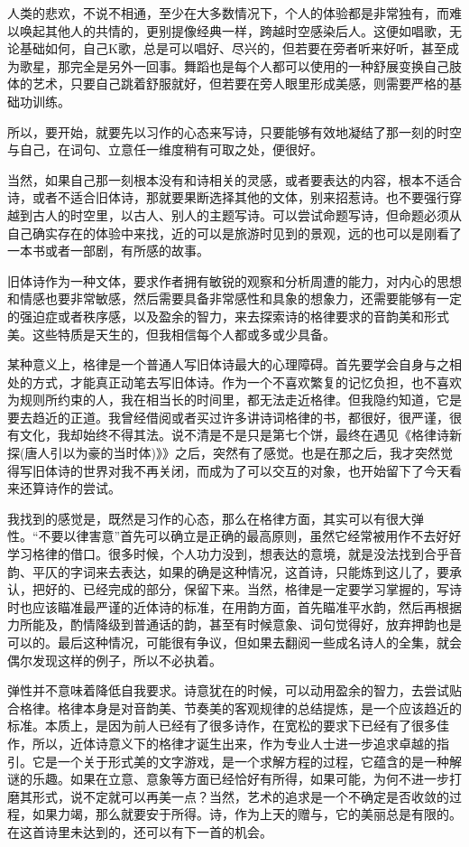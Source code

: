 \documentclass{article}
\begin{document}
人类的悲欢，不说不相通，至少在大多数情况下，个人的体验都是非常独有，而难以唤起其他人的共情的，更别提像经典一样，跨越时空感染后人。这便如唱歌，无论基础如何，自己K歌，总是可以唱好、尽兴的，但若要在旁者听来好听，甚至成为歌星，那完全是另外一回事。舞蹈也是每个人都可以使用的一种舒展变换自己肢体的艺术，只要自己跳着舒服就好，但若要在旁人眼里形成美感，则需要严格的基础功训练。

所以，要开始，就要先以习作的心态来写诗，只要能够有效地凝结了那一刻的时空与自己，在词句、立意任一维度稍有可取之处，便很好。

当然，如果自己那一刻根本没有和诗相关的灵感，或者要表达的内容，根本不适合诗，或者不适合旧体诗，那就要果断选择其他的文体，别来招惹诗。也不要强行穿越到古人的时空里，以古人、别人的主题写诗。可以尝试命题写诗，但命题必须从自己确实存在的体验中来找，近的可以是旅游时见到的景观，远的也可以是刚看了一本书或者一部剧，有所感的故事。

旧体诗作为一种文体，要求作者拥有敏锐的观察和分析周遭的能力，对内心的思想和情感也要非常敏感，然后需要具备非常感性和具象的想象力，还需要能够有一定的强迫症或者秩序感，以及盈余的智力，来去探索诗的格律要求的音韵美和形式美。这些特质是天生的，但我相信每个人都或多或少具备。

某种意义上，格律是一个普通人写旧体诗最大的心理障碍。首先要学会自身与之相处的方式，才能真正动笔去写旧体诗。作为一个不喜欢繁复的记忆负担，也不喜欢为规则所约束的人，我在相当长的时间里，都无法走近格律。但我隐约知道，它是要去趋近的正道。我曾经借阅或者买过许多讲诗词格律的书，都很好，很严谨，很有文化，我却始终不得其法。说不清是不是只是第七个饼，最终在遇见《格律诗新探(唐人引以为豪的当时体)》》之后，突然有了感觉。也是在那之后，我才突然觉得写旧体诗的世界对我不再关闭，而成为了可以交互的对象，也开始留下了今天看来还算诗作的尝试。

我找到的感觉是，既然是习作的心态，那么在格律方面，其实可以有很大弹性。``不要以律害意''首先可以确立是正确的最高原则，虽然它经常被用作不去好好学习格律的借口。很多时候，个人功力没到，想表达的意境，就是没法找到合乎音韵、平仄的字词来去表达，如果的确是这种情况，这首诗，只能炼到这儿了，要承认，把好的、已经完成的部分，保留下来。当然，格律是一定要学习掌握的，写诗时也应该瞄准最严谨的近体诗的标准，在用韵方面，首先瞄准平水韵，然后再根据力所能及，酌情降级到普通话的韵，甚至有时候意象、词句觉得好，放弃押韵也是可以的。最后这种情况，可能很有争议，但如果去翻阅一些成名诗人的全集，就会偶尔发现这样的例子，所以不必执着。

弹性并不意味着降低自我要求。诗意犹在的时候，可以动用盈余的智力，去尝试贴合格律。格律本身是对音韵美、节奏美的客观规律的总结提炼，是一个应该趋近的标准。本质上，是因为前人已经有了很多诗作，在宽松的要求下已经有了很多佳作，所以，近体诗意义下的格律才诞生出来，作为专业人士进一步追求卓越的指引。它是一个关于形式美的文字游戏，是一个求解方程的过程，它蕴含的是一种解谜的乐趣。如果在立意、意象等方面已经恰好有所得，如果可能，为何不进一步打磨其形式，说不定就可以再美一点？当然，艺术的追求是一个不确定是否收敛的过程，如果力竭，那么就要安于所得。诗，作为上天的赠与，它的美丽总是有限的。在这首诗里未达到的，还可以有下一首的机会。
\end{document}
